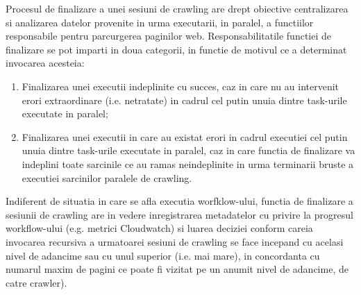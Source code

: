 Procesul de finalizare a unei sesiuni de crawling are drept obiective centralizarea si analizarea datelor provenite in urma executarii, in paralel, a functiilor responsabile pentru parcurgerea paginilor web. Responsabilitatile functiei de finalizare se pot imparti in doua categorii, in functie de motivul ce a determinat invocarea acesteia:

\begin{enumerate}
	\item{Finalizarea unei executii indeplinite cu succes, caz in care nu au intervenit erori extraordinare (i.e. netratate) in cadrul cel putin unuia dintre task-urile executate in paralel;}
	\item{Finalizarea unei executii in care au existat erori in cadrul executiei cel putin unuia dintre task-urile executate in paralel, caz in care functia de finalizare va indeplini toate sarcinile ce au ramas neindeplinite in urma terminarii bruste a executiei sarcinilor paralele de crawling.}
\end{enumerate} 

Indiferent de situatia in care se afla executia worfklow-ului, functia de finalizare a sesiunii de crawling are in vedere inregistrarea metadatelor cu privire la progresul workflow-ului (e.g. metrici Cloudwatch) si luarea deciziei conform careia invocarea recursiva a urmatoarei sesiuni de crawling se face incepand cu acelasi nivel de adancime sau cu unul superior (i.e. mai mare), in concordanta cu numarul maxim de pagini ce poate fi vizitat pe un anumit nivel de adancime, de catre crawler).

